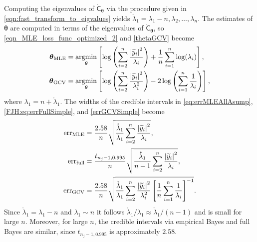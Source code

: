 \documentclass{iitthesis}          %
\newcommand{\bm}[1]{\boldsymbol{#1}}
\newcommand{\rlambda}{\mathring{\lambda}}
\newcommand{\vtheta}{{\bm{\theta}}}
\newcommand{\rmC}{\mathring{\mathsf{C}}}
\newcommand{\MLE}{\textup{MLE}}
\newcommand{\GCV}{\textup{GCV}}
\newcommand{\err}{\textup{err}}
\def\abs#1{\ensuremath{\left \lvert #1 \right \rvert}}
\providecommand{\argmin}{\operatorname*{argmin}}
\begin{document}
Computing the eigenvalues of $\rmC_\vtheta$ via the procedure given in \eqref{eqn:fast_transform_to_eigvalues} yields $\rlambda_1 = \lambda_1 - n, \lambda_2, \ldots, \lambda_n$. The estimates of $\vtheta$ are computed in terms of the eigenvalues of $\rmC_\vtheta$, so \eqref{eqn_MLE_loss_func_optimized_2} and \eqref{thetaGCV} become
\begin{subequations}
	\label{thetaSimple}
	\begin{align}
	\vtheta_\MLE
	&= 
	\argmin_{\vtheta}
	\left[
	\log\left(
	\sum_{i=2}^n \frac{\abs{\widetilde{y}_i}^2}{\lambda_i}
	\right) 
	+ 
	\frac{1}{n}\sum_{i=1}^n \log(\lambda_i)
	\right], \\
	\vtheta_{\GCV} 
	&= \argmin_\vtheta \left[ \log \left ( \sum_{i=2}^n \frac{\abs{\widetilde{y}_i}^2}{\lambda_i^2} 
	\right)  -2\log\left( \sum_{i=1}^n \frac{1}{\lambda_i} \right)
	\right],
	\end{align}
\end{subequations}
where $\lambda_1 = n + \rlambda_1$.  The widths of the credible intervals in \eqref{eq:errMLEAllAsump}, \eqref{FJH:eq:errFullSimple}, and   \eqref{errGCVSimple} become
\begin{subequations}
	\label{fastStoppingCriterions}
	\begin{align}
	\label{fastStoppingCriterionMLE}
	\err_\MLE  &
	=
	\frac{2.58}{n}\sqrt{
		\frac{\rlambda_1}{\lambda_1}
		\sum_{i=2}^{n} \frac{\abs{\widetilde{y}_i}^2}{\lambda_i}  
	}, 
	\\
	\label{fastStoppingCriterionFull}
	\err_{\textup{full}} 
	& = \frac{t_{n_j-1,0.995}}{n} \sqrt{
		\frac{\rlambda_1}{n-1} \sum_{i=2}^n \frac{\abs{\widetilde{y}_i}^2}{\lambda_i}
	}, \\
	\label{fastStoppingCriterionGCV}
	\err_{\textup{GCV}} & =
	\frac{2.58}{n}\sqrt{	\frac{\rlambda_1}{\lambda_1} \sum_{i=2}^n \frac{\abs{\widetilde{y}_i}^2}{\lambda_i^2}  \left [ \frac 1n \sum_{i=1}^n \frac{1}{\lambda_i} \right]^{-1}} .
	\end{align}
\end{subequations}
Since $\rlambda_1 = \lambda_1 - n$ and $\lambda_1 \sim n$ it follows $\rlambda_1/\lambda_1 \approx \rlambda_1/(n-1)$ and is small for  large $n$.  Moreover, for large $n$, the credible intervals via empirical Bayes and full Bayes are similar, since $t_{n_j-1,0.995}$ is approximately $2.58$. 
\end{document}
